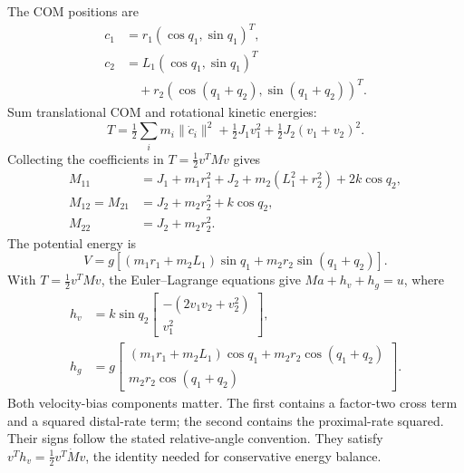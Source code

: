 The COM positions are
\begin{equation}
\begin{aligned}
c_1&=r_1(\cos q_1,\sin q_1)^T,\\
c_2&=L_1(\cos q_1,\sin q_1)^T\\
&\quad+r_2(\cos(q_1+q_2),\sin(q_1+q_2))^T.
\end{aligned}
\end{equation}
Sum translational COM and rotational kinetic energies:
\begin{equation}
T=\tfrac12\sum_i m_i\|\dot c_i\|^2+\tfrac12J_1v_1^2+\tfrac12J_2(v_1+v_2)^2.
\end{equation}
Collecting the coefficients in $T=\tfrac12v^TMv$ gives
\begin{equation}
\begin{aligned}
M_{11}&=J_1+m_1r_1^2+J_2+m_2(L_1^2+r_2^2)+2k\cos q_2,\\
M_{12}=M_{21}&=J_2+m_2r_2^2+k\cos q_2,\\
M_{22}&=J_2+m_2r_2^2.
\end{aligned}
\label{eq:double_pend_mass_matrix}
\end{equation}
The potential energy is
\begin{equation}
V=g[(m_1r_1+m_2L_1)\sin q_1+m_2r_2\sin(q_1+q_2)].
\end{equation} With $T=\tfrac12v^TMv$, the Euler--Lagrange equations give $M a+h_v+h_g=u$, where
\begin{equation}
\begin{aligned}
h_v&=k\sin q_2\begin{bmatrix}-(2v_1v_2+v_2^2)\\v_1^2\end{bmatrix},\\
h_g&=g\begin{bmatrix}(m_1r_1+m_2L_1)\cos q_1+m_2r_2\cos(q_1+q_2)\\m_2r_2\cos(q_1+q_2)\end{bmatrix}.
\end{aligned}
\label{eq:coriolis_1}
\end{equation}
Both velocity-bias components matter. The first contains a factor-two cross term and a squared distal-rate term; the second contains the proximal-rate squared. Their signs follow the stated relative-angle convention. They satisfy $v^Th_v=\tfrac12v^T\dot Mv$, the identity needed for conservative energy balance.


